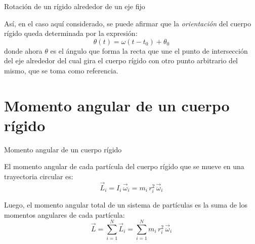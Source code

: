 \documentclass[11pt,handout,aspectratio=1610]{beamer}
\newcommand{\vs}{\vspace{0.3cm}}
\begin{document}
\begin{frame}{Rotación de un rígido alrededor de un eje fijo}

    Así, en el caso aquí considerado, se puede afirmar que la \emph{orientación} del cuerpo rígido queda determinada por la expresión: $$\theta (t) = \omega \left(t - t_0\right) + \theta_0$$ donde ahora $\theta$ es el ángulo que forma la recta que une el punto de intersección del eje alrededor del cual gira el cuerpo rígido con otro punto arbitrario del mismo, que se toma como referencia.

    \begin{center}
    \end{center}

\end{frame}

\section{Momento angular de un cuerpo rígido}

\begin{frame}{Momento angular de un cuerpo rígido}

    El momento angular de cada partícula del cuerpo rígido que se mueve en una trayectoria circular es: $$\vec{L}_i = I_i \, \vec{\omega}_i = m_i \, r_i^2 \, \vec{\omega}_i$$
    
    \vs

    Luego, el momento angular total de un sistema de partículas es la suma de los momentos angulares de cada partícula: $$\vec{L} = \sum_{i=1}^N \vec{L}_i = \sum_{i=1}^N m_i \, r_i^2 \, \vec{\omega}_i$$
    
\end{frame}
    
\end{document}
